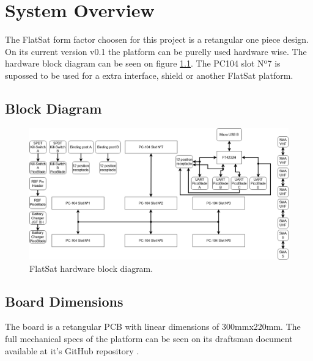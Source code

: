 %
%
%
%
%

%
%
%
%
%
%

\chapter{System Overview} \label{ch:system-overview}

The FlatSat form factor choosen for this project is a retangular one piece design. On its current version v0.1 the platform can be purelly used hardware wise. The hardware block diagram can be seen on figure \ref{fig:block-diagram}. The PC104 slot Nº7 is supossed to be used for a extra interface, shield or another FlatSat platform.

\section{Block Diagram}

\begin{figure}[!ht]
    \begin{center}
        \includegraphics[width=\textwidth]{figures/flatsat_block_diagram.png}
        \caption{FlatSat hardware block diagram.}
        \label{fig:block-diagram}
    \end{center}
\end{figure}

\section{Board Dimensions}

The board is a retangular PCB with linear dimensions of 300mmx220mm. The full mechanical specs of the platform can be seen on its draftsman document available at it's GitHub repository \cite{flatsat-draftsman}.